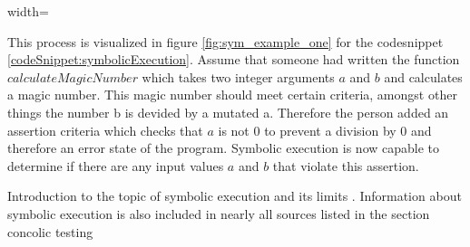 \begin {figure*}
\begin{adjustbox}{width=\textwidth}
\end{adjustbox}
\caption{Example of a symbolic execution tree based on the function displayed in codesnippet \ref{codeSnippet:symbolicExecution}}
\label{fig:sym_example_one}
\end{figure*}
This process is visualized in figure \ref{fig:sym_example_one} for the codesnippet \ref{codeSnippet:symbolicExecution}. Assume that someone had written the function $calculateMagicNumber$ which takes two integer arguments $a$ and $b$ and calculates a magic number. This magic number should meet certain criteria, amongst other things the number b is devided by a mutated a. Therefore the person added an assertion criteria which checks that $a$ is not $0$ to prevent a division by 0 and therefore an error state of the program. Symbolic execution is now capable to determine if there are any input values $a$  and $b$ that violate this assertion.


Introduction to the topic of symbolic execution and its limits \cite{SurveySymExec-CSUR18} . Information about symbolic execution is also included in nearly all sources listed in the section concolic testing